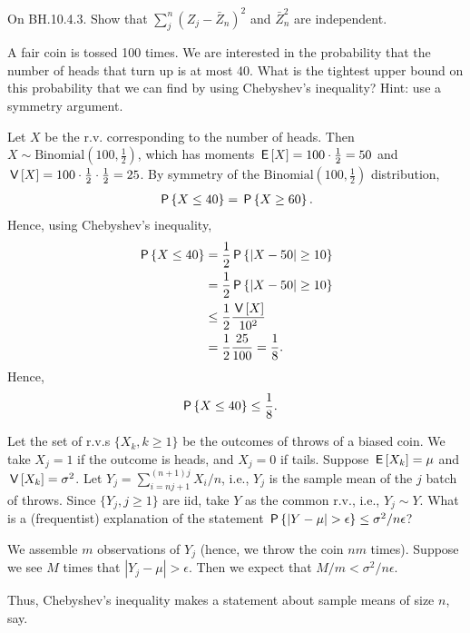 \begin{exercise}
On BH.10.4.3. Show that $\sum_j^n (Z_j-\bar Z_n)^2$ and $\bar Z_n^2$ are independent.
\begin{hint}
\end{hint}
\begin{solution}
\end{solution}
\end{exercise}

\begin{exercise}
A fair coin is tossed 100 times. We are interested in the probability that the number of heads that turn up is at most 40. What is the tightest upper bound on this probability that we can find by using Chebyshev's inequality? Hint: use a symmetry argument.
\begin{solution}
Let $X$ be the r.v. corresponding to the number of heads. Then $X\sim \text{Binomial}\left(100,\frac12\right)$, which has moments $\E{X} = 100 \cdot \frac{1}{2} = 50$ and $\V{X} = 100 \cdot \frac{1}{2} \cdot \frac{1}{2} = 25$. By symmetry of the $\text{Binomial}\left(100,\frac12\right)$ distribution,
\begin{align}
    \P{ X \leq 40} = \P{ X \geq 60 }.
\end{align}
Hence, using Chebyshev's inequality,
\begin{align}
    \P{ X \leq 40} &= \frac{1}{2}  \P{ |X - 50| \geq 10 } \\
    &= \frac{1}{2} \P{ |X - 50| \geq 10 } \\
    &\leq \frac{1}{2} \frac{\V{X}}{10^2} \\
    &= \frac{1}{2} \frac{25}{100} = \frac{1}{8}.
\end{align}
Hence,
\begin{align}
    \P{ X \leq 40} &\leq \frac{1}{8}.
\end{align}
\end{solution}
\end{exercise}


\begin{exercise}\label{ex:13-1}
Let the set of r.v.s $\{X_{k}, k\geq 1\}$ be the outcomes of throws of a biased coin. We take $X_{j}=1$ if the outcome is heads, and $X_{j}=0$ if tails. Suppose $\E{X_{k}} = \mu$ and $\V{X_{k}} = \sigma^{2}$.
Let $Y_{j} = \sum_{i=n j + 1}^{(n+1)j} X_{i}/n$, i.e., $Y_{j}$ is the sample mean of the $j$ batch of throws. Since $\{Y_{j}, j\geq 1\}$ are iid, take $Y$ as the common r.v., i.e., $Y_{j} \sim Y$.
What is a (frequentist) explanation of the statement $\P{|Y-\mu|>\epsilon} \leq \sigma^{2}/n \epsilon$?
\begin{solution}
  We assemble $m$ observations of $Y_{j}$ (hence, we throw the coin $n m$ times).
  Suppose we see $M$ times that $|Y_{j} - \mu|> \epsilon$. Then we expect that $M/m < \sigma^{2}/n\epsilon$.

Thus,  Chebyshev's inequality makes a statement about sample means of size $n$, say.
\end{solution}
\end{exercise}

